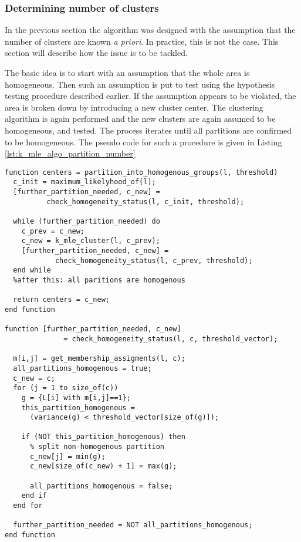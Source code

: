 \subsubsection{Determining number of clusters}

In the previous section the algorithm was designed with the assumption that the number of clusters are known \textit{a priori}. 
In practice, this is not the case. This section will describe how the issue is to be tackled.

The basic idea is to start with an assumption that the whole area is homogeneous.
Then such an assumption is put to test using the hypothesis testing procedure described earlier. 
If the assumption appears to be violated, the area is broken down by introducing a new cluster center. 
The clustering algorithm is again performed and the new clusters are again assumed to be homogeneous, and tested. 
The process iterates until all partitions are confirmed to be homogeneous. 
The pseudo code for such a procedure is given in Listing \ref{lst:k_mle_algo_partition_number}

\lstset{language=Matlab,caption=Homogenous partitions number growing,label=lst:k_mle_algo_partition_number}
\begin{lstlisting}[frame=tb]
function centers = partition_into_homogenous_groups(l, threshold)
  c_init = maximum_likelyhood_of(l);
  [further_partition_needed, c_new] = 
          check_homogeneity_status(l, c_init, threshold);

  while (further_partition_needed) do
    c_prev = c_new;
    c_new = k_mle_cluster(l, c_prev);
    [further_partition_needed, c_new] = 
            check_homogeneity_status(l, c_prev, threshold);    
  end while
  %after this: all paritions are homogenous

  return centers = c_new; 
end function

function [further_partition_needed, c_new] 
              = check_homogeneity_status(l, c, threshold_vector);    

  m[i,j] = get_membership_assigments(l, c);
  all_partitions_homogenous = true;
  c_new = c;
  for (j = 1 to size_of(c)) 
    g = {L[i] with m[i,j]==1};
    this_partition_homogenous = 
      (variance(g) < threshold_vector[size_of(g)]);

    if (NOT this_partition_homogenous) then
      % split non-homogenous partition
      c_new[j] = min(g);
      c_new[size_of(c_new) + 1] = max(g);

      all_partitions_homogenous = false;
    end if
  end for

  further_partition_needed = NOT all_partitions_homogenous;
end function
\end{lstlisting}

